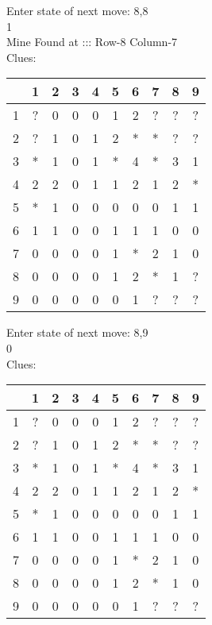 Enter state of next move: 8,8\\
1\\
Mine Found at ::: Row-8 Column-7\\
Clues:\\
\begin{tabular}{|c|c|c|c|c|c|c|c|c|c|}
\hline
  & 1 & 2 & 3 & 4 & 5 & 6 & 7 & 8 & 9\\
\hline
1 & ? & 0 & 0 & 0 & 1 & 2 & ? & ? & ?\\
\hline
2 & ? & 1 & 0 & 1 & 2 & * & * & ? & ?\\
\hline
3 & * & 1 & 0 & 1 & * & 4 & * & 3 & 1\\
\hline
4 & 2 & 2 & 0 & 1 & 1 & 2 & 1 & 2 & *\\
\hline
5 & * & 1 & 0 & 0 & 0 & 0 & 0 & 1 & 1\\
\hline
6 & 1 & 1 & 0 & 0 & 1 & 1 & 1 & 0 & 0\\
\hline
7 & 0 & 0 & 0 & 0 & 1 & * & 2 & 1 & 0\\
\hline
8 & 0 & 0 & 0 & 0 & 1 & 2 & * & 1 & ?\\
\hline
9 & 0 & 0 & 0 & 0 & 0 & 1 & ? & ? & ?\\
\hline
\end{tabular}

Enter state of next move: 8,9\\
0\\
Clues:\\
\begin{tabular}{|c|c|c|c|c|c|c|c|c|c|}
\hline
  & 1 & 2 & 3 & 4 & 5 & 6 & 7 & 8 & 9\\
\hline
1 & ? & 0 & 0 & 0 & 1 & 2 & ? & ? & ?\\
\hline
2 & ? & 1 & 0 & 1 & 2 & * & * & ? & ?\\
\hline
3 & * & 1 & 0 & 1 & * & 4 & * & 3 & 1\\
\hline
4 & 2 & 2 & 0 & 1 & 1 & 2 & 1 & 2 & *\\
\hline
5 & * & 1 & 0 & 0 & 0 & 0 & 0 & 1 & 1\\
\hline
6 & 1 & 1 & 0 & 0 & 1 & 1 & 1 & 0 & 0\\
\hline
7 & 0 & 0 & 0 & 0 & 1 & * & 2 & 1 & 0\\
\hline
8 & 0 & 0 & 0 & 0 & 1 & 2 & * & 1 & 0\\
\hline
9 & 0 & 0 & 0 & 0 & 0 & 1 & ? & ? & ?\\
\hline
\end{tabular}

